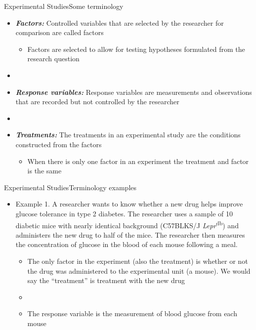 \documentclass[xcolor=dvipsnames]{beamer}
\begin{document}
\begin{frame}{Experimental Studies}{Some terminology}
	\begin{itemize}
			\item \textbf{\emph{Factors:}} Controlled variables that are selected by the researcher for comparison are called factors
		\begin{itemize}
			\item Factors are selected to allow for testing hypotheses formulated from the research question
		\end{itemize}
		\item[]
		\item \textbf{\emph{Response variables:}} Response variables are measurements and observations that are recorded but not controlled by the researcher
		\item[]
		\item \textbf{\emph{Treatments:}} The treatments in an experimental study are the conditions constructed from the factors
		\begin{itemize}
			\item When there is only one factor in an experiment the treatment and factor is the same
		\end{itemize}
	\end{itemize}
\end{frame}

\begin{frame}{Experimental Studies}{Terminology examples}
	\begin{itemize}
		\item Example 1. A researcher wants to know whether a new drug helps improve glucose tolerance in type 2 diabetes. The researcher uses a sample of 10 diabetic mice with nearly identical background (C57BLKS/J \emph{Lepr}\textsuperscript{db}) and administers the new drug to half of the mice. The researcher then measures the concentration of glucose in the blood of each mouse following a meal. 
		\begin{itemize}
			\item The only factor in the experiment (also the treatment) is whether or not the drug was administered to the experimental unit (a mouse). We would say the ``treatment'' is treatment with the new drug
			\item[]
			\item The response variable is the measurement of blood glucose from each mouse
		\end{itemize}
	\end{itemize}
\end{frame}
\end{document}
